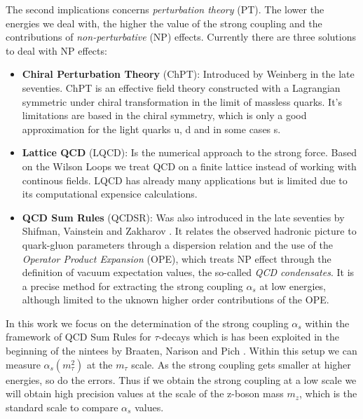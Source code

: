 \documentclass[../../index.tex]{subfiles}
\begin{document}
The second implications concerns \textit{perturbation theory} (PT). The lower
the energies we deal with, the higher the value of the strong coupling and the
contributions of \textit{non-perturbative} (NP) effects. Currently there are
three solutions to deal with NP effects:
\begin{itemize}
  \item \textbf{Chiral Perturbation Theory} (ChPT): Introduced by Weinberg
    \cite{Weinberg1978} in the late seventies. ChPT is an effective field theory
    constructed with a Lagrangian symmetric under chiral transformation in the
    limit of massless quarks. It's limitations are based in the chiral symmetry,
    which is only a good approximation for the light quarks u, d and in some
    cases s.
  \item \textbf{Lattice QCD} (LQCD): Is the numerical approach to the strong
    force. Based on the Wilson Loops \cite{Wilson1974} we treat QCD on a finite
    lattice instead of working with continous fields. LQCD has already many applications but
    is limited due to its computational expensice calculations.
  \item \textbf{QCD Sum Rules} (QCDSR): Was also introduced in the late seventies by
    Shifman, Vainstein and Zakharov \cite{Shifman1978,Shifman1978a}. It relates
    the observed hadronic picture to quark-gluon parameters through a dispersion
    relation and the use of the \textit{Operator Product Expansion} (OPE), which
    treats NP effect through the definition of vacuum expectation values, the
    so-called \textit{QCD condensates}. It is a precise method for extracting
    the strong coupling $\alpha_s$ at low energies, although limited to
    the uknown higher order contributions of the OPE.
\end{itemize}

In this work we focus on the determination of the strong coupling $\alpha_s$
within the framework of QCD Sum Rules for $\tau$-decays which is has been
exploited in the beginning of the nintees by Braaten, Narison and Pich \cite{Braaten1991}. Within this setup we
can measure $\alpha_s(m_\tau^2)$ at the $m_\tau$ scale. As the strong coupling
gets smaller at higher energies, so do the errors. Thus if we obtain the strong
coupling at a low scale we will obtain high precision values at the scale of the
z-boson mass $m_z$, which is the standard scale to compare $\alpha_s$ values.
\end{document}
